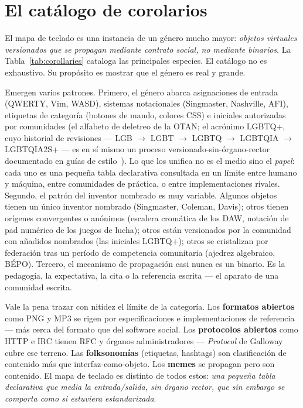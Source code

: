 \documentclass[10pt,letterpaper,twocolumn]{article}
\begin{document}
\section{El catálogo de corolarios}
\label{sec:corollaries}

El mapa de teclado es una instancia de un género mucho mayor: \emph{objetos virtuales versionados que se propagan mediante contrato social, no mediante binarios}. La Tabla~\ref{tab:corollaries} cataloga las principales especies. El catálogo no es exhaustivo. Su propósito es mostrar que el género es real y grande.


Emergen varios patrones. Primero, el género abarca asignaciones de entrada (QWERTY, Vim, WASD), sistemas notacionales (Singmaster, Nashville, AFI), etiquetas de categoría (botones de mando, colores CSS) e iniciales autorizadas por comunidades (el alfabeto de deletreo de la OTAN; el acrónimo LGBTQ+, cuyo historial de revisiones --- LGB $\rightarrow$ LGBT $\rightarrow$ LGBTQ $\rightarrow$ LGBTQIA $\rightarrow$ LGBTQIA2S+ --- es en sí mismo un proceso versionado-sin-órgano-rector documentado en guías de estilo~\citep{glaad_reference_guide}). Lo que los unifica no es el medio sino el \emph{papel}: cada uno es una pequeña tabla declarativa consultada en un límite entre humano y máquina, entre comunidades de práctica, o entre implementaciones rivales. Segundo, el patrón del inventor nombrado es muy variable. Algunos objetos tienen un único inventor nombrado (Singmaster, Coleman, Davis); otros tienen orígenes convergentes o anónimos (escalera cromática de los DAW, notación de pad numérico de los juegos de lucha); otros están versionados por la comunidad con añadidos nombrados (las iniciales LGBTQ+); otros se cristalizan por federación tras un período de competencia comunitaria (ajedrez algebraico, BÉPO). Tercero, el mecanismo de propagación casi nunca es un binario. Es la pedagogía, la expectativa, la cita o la referencia escrita --- el aparato de una comunidad escrita.

Vale la pena trazar con nitidez el límite de la categoría. Los \textbf{formatos abiertos} como PNG y MP3 se rigen por especificaciones e implementaciones de referencia~\citep{sterne2012mp3} --- más cerca del formato que del software social. Los \textbf{protocolos abiertos} como HTTP e IRC tienen RFC y órganos administradores --- \emph{Protocol} de Galloway~\citep{galloway2004protocol} cubre ese terreno. Las \textbf{folksonomías} (etiquetas, hashtags) son clasificación de contenido más que interfaz-como-objeto. Los \textbf{memes} se propagan pero son contenido. El mapa de teclado es distinto de todos estos: \emph{una pequeña tabla declarativa que media la entrada/salida, sin órgano rector, que sin embargo se comporta como si estuviera estandarizada}.
\end{document}
